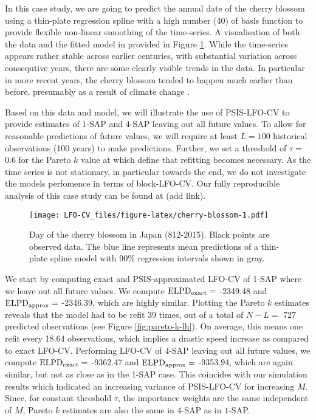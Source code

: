 \documentclass[american,]{article}
\begin{document}
In this case study, we are going to predict the annual date of the cherry
blossom using a thin-plate regression spline \citep{wood2003} with a high number (40)
of basis function to provide flexible non-linear smoothing of the time-series. A
visualisation of both the data and the fitted model in provided in Figure
\ref{fig:cherry-blossom}. While the time-series appears rather stable across
earlier centuries, with substantial variation across consequtive years, there
are some clearly visible trends in the data. In particular in more recent years,
the cherry blossom tended to happen much earlier than before, presumably as a
result of climate change \citep{aono2008, aono2010}.

Based on this data and model, we will illustrate the use of PSIS-LFO-CV to
provide estimates of \(1\)-SAP and \(4\)-SAP leaving out all future values. To allow
for reasonable predictions of future values, we will require at least \(L = 100\)
historical observations (100 years) to make predictions. Further, we set a
threshold of \(\tau =\) 0.6 for the Pareto \(k\) value at which define that
refitting becomes necessary. As the time series is not stationary, in particular
towards the end, we do not investigate the models perfomence in terms of
block-LFO-CV. Our fully reproducible analysis of this case study can be found at
(add link).

\begin{figure}
\centering
\texttt{[image: LFO-CV\_files/figure-latex/cherry-blossom-1.pdf]}
\caption{\label{fig:cherry-blossom}Day of the cherry blossom in Japan (812-2015). Black points are observed data. The blue line represents mean predictions of a thin-plate spline model with 90\% regression intervals shown in gray.}
\end{figure}

We start by computing exact and PSIS-approximated LFO-CV of 1-SAP where we leave
out all future values. We compute \({\rm ELPD}_{\rm exact} =\)
-2349.48 and \({\rm ELPD}_{\rm approx} =\)
-2346.39, which are highly similar. Plotting the
Pareto \(k\) estimates reveals that the model had to be refit 39 times,
out of a total of \(N - L =\) 727 predicted observations (see Figure
\ref{fig:pareto-k-lh}). On average, this means one refit every 18.64 observations, which implies a drastic speed increase as compared
to exact LFO-CV. Performing LFO-CV of 4-SAP leaving out all future values, we
compute \({\rm ELPD}_{\rm exact} =\) -9362.47 and \({\rm ELPD}_{\rm approx} =\) -9353.94, which are again
similar, but not as close as in the 1-SAP case. This coincides with our simulation
results which indicated an increasing variance of PSIS-LFO-CV for increasing \(M\).
Since, for constant threshold
\(\tau\), the importance weights are the same independent of \(M\), Pareto \(k\)
estimates are also the same in \(4\)-SAP as in \(1\)-SAP.
\end{document}
